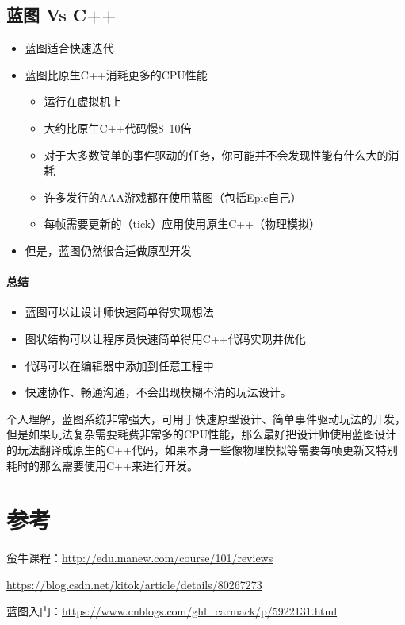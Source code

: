 \documentclass[UTF8,a4paper,12pt]{ctexbook}
\begin{document}
		\subsection{蓝图 Vs C++}
			\begin{itemize}
				\item 蓝图适合快速迭代
				\item 蓝图比原生C++消耗更多的CPU性能
					\begin{itemize}
						\item 运行在虚拟机上
						\item 大约比原生C++代码慢8~10倍
						\item 对于大多数简单的事件驱动的任务，你可能并不会发现性能有什么大的消耗
						\item 许多发行的AAA游戏都在使用蓝图（包括Epic自己）
						\item 每帧需要更新的（tick）应用使用原生C++（物理模拟）
					\end{itemize}
				\item 但是，蓝图仍然很合适做原型开发
			\end{itemize}
			
			\paragraph{总结}
				\begin{itemize}
					\item 蓝图可以让设计师快速简单得实现想法
					\item 图状结构可以让程序员快速简单得用C++代码实现并优化
					\item 代码可以在编辑器中添加到任意工程中
					\item 快速协作、畅通沟通，不会出现模糊不清的玩法设计。
				\end{itemize}
				
				个人理解，蓝图系统非常强大，可用于快速原型设计、简单事件驱动玩法的开发，但是如果玩法复杂需要耗费非常多的CPU性能，那么最好把设计师使用蓝图设计的玩法翻译成原生的C++代码，如果本身一些像物理模拟等需要每帧更新又特别耗时的那么需要使用C++来进行开发。

	\section{参考}
			蛮牛课程：\url{http://edu.manew.com/course/101/reviews}
		
			\url{https://blog.csdn.net/kitok/article/details/80267273}
			
			蓝图入门：\url{https://www.cnblogs.com/ghl_carmack/p/5922131.html}
			
\end{document}
